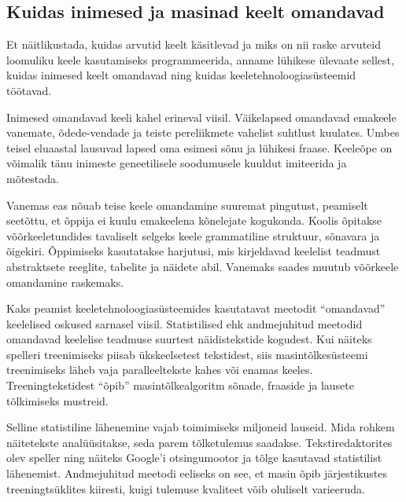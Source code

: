 \begin{multicols}{2}
\subsection{Kuidas inimesed ja masinad keelt omandavad}

Et näitlikustada, kuidas arvutid keelt käsitlevad ja miks on nii raske arvuteid loomuliku keele kasutamiseks programmeerida, anname lühikese ülevaate sellest, kuidas inimesed keelt omandavad ning kuidas keeletehnoloogiasüsteemid töötavad. 



Inimesed omandavad keeli kahel erineval viisil. 
Väikelapsed omandavad emakeele vanemate, õdede-vendade ja teiste pere\-liikmete vahelist suhtlust kuulates. 
Umbes teisel eluaastal lausuvad lapsed oma esi\-mesi sõnu ja lühikesi fraase. 
Keeleõpe on võimalik tänu inimeste geneetilisele soodumusele kuuldut imiteerida ja mõtestada.

Vanemas eas nõuab teise keele omandamine suuremat pingutust, peamiselt seetõttu, et õppija ei kuulu emakeelena kõnelejate kogukonda. 
Koolis õpitakse võõrkeeletundides tavaliselt selgeks keele grammatiline struktuur, sõnavara ja õigekiri. 
Õppimiseks kasutatakse harjutusi, mis kirjeldavad keelelist teadmust abstraktsete reeglite, tabelite ja näidete abil.
Vanemaks saades muutub võõrkeele omandamine raskemaks.

Kaks peamist keeletehnoloogiasüsteemides kasutatavat meetodit ``omandavad'' keele\-lised oskused sarnasel viisil. 
Statistilised ehk andmejuhitud meetodid omandavad keelelise teadmuse suurtest näidistekstide kogudest. 
Kui näiteks spelleri treeni\-miseks piisab ükskeelsetest tekstidest, siis masintõlkesüsteemi treenimiseks läheb vaja paralleeltekste kahes või enamas keeles. 
Treeningtekstidest ``õpib'' masintõlkealgoritm sõnade, fraaside ja lausete tõlkimiseks mustreid. 

Selline statistiline lähenemine vajab toimi\-miseks miljoneid lauseid. 
Mida rohkem näitetekste analüüsitakse, seda parem tõlketulemus saadakse. 
Tekstiredaktorites olev speller ning näiteks Google’i otsingumootor ja tõlge kasutavad statistilist lähe\-ne\-mist. 
Andmejuhitud meetodi eeliseks on see, et masin õpib järjestikustes treening\-tsüklites kiiresti, kuigi tulemuse kvaliteet võib oluliselt varieeruda.


\end{multicols}
